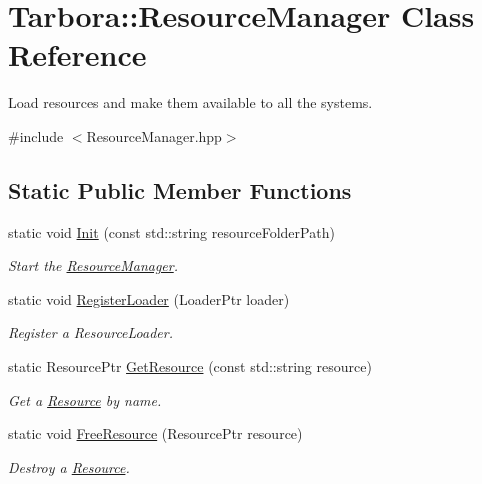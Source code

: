 \hypertarget{classTarbora_1_1ResourceManager}{}\section{Tarbora\+:\+:Resource\+Manager Class Reference}
\label{classTarbora_1_1ResourceManager}


Load resources and make them available to all the systems.  




{\ttfamily \#include $<$Resource\+Manager.\+hpp$>$}

\subsection*{Static Public Member Functions}
\begin{DoxyCompactItemize}
\item 
static void \hyperlink{classTarbora_1_1ResourceManager_a1db550759320be50e86b316275da889c}{Init} (const std\+::string resource\+Folder\+Path)
\begin{DoxyCompactList}\small\item\em Start the \hyperlink{classTarbora_1_1ResourceManager}{Resource\+Manager}. \end{DoxyCompactList}\item 
static void \hyperlink{classTarbora_1_1ResourceManager_a531683525f49833ac4b06916cd8a2bc8}{Register\+Loader} (Loader\+Ptr loader)
\begin{DoxyCompactList}\small\item\em Register a {\itshape Resource\+Loader}. \end{DoxyCompactList}\item 
static Resource\+Ptr \hyperlink{classTarbora_1_1ResourceManager_a755c3216ac424ec13d28fa84b0814e0b}{Get\+Resource} (const std\+::string resource)
\begin{DoxyCompactList}\small\item\em Get a \hyperlink{classTarbora_1_1Resource}{Resource} by name. \end{DoxyCompactList}\item 
static void \hyperlink{classTarbora_1_1ResourceManager_a7267c1da4dc124b41f34b6c870fdb10e}{Free\+Resource} (Resource\+Ptr resource)
\begin{DoxyCompactList}\small\item\em Destroy a \hyperlink{classTarbora_1_1Resource}{Resource}. \end{DoxyCompactList}\item 

\end{DoxyCompactItemize}
